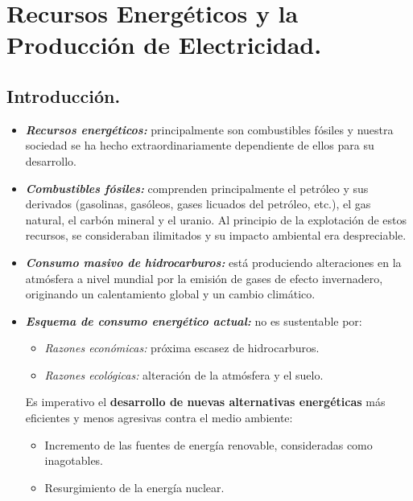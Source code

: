 \section{Recursos Energéticos y la Producción de Electricidad.}

\subsection{Introducción.}
	\begin{itemize}
		\item \textit{\textbf{Recursos energéticos:}}
			principalmente son combustibles fósiles y nuestra sociedad se ha
			hecho extraordinariamente dependiente de ellos para su desarrollo.
		
		\item \textit{\textbf{Combustibles fósiles:}}
			comprenden principalmente el petróleo y sus derivados (gasolinas,
			gasóleos, gases licuados del petróleo, etc.), el gas natural, el carbón mineral y el uranio.\linebreak
			Al principio de la explotación de estos recursos, se consideraban ilimitados y su impacto
			ambiental era despreciable.
			
		\item \textit{\textbf{Consumo masivo de hidrocarburos:}} está produciendo alteraciones en la atmósfera a nivel mundial
		por la emisión de gases de efecto invernadero, originando un calentamiento global y un cambio
		climático.
		
		\item \textit{\textbf{Esquema de consumo energético actual:}} no es sustentable por:
		\begin{itemize}
			\item \textit{Razones económicas:} próxima escasez de hidrocarburos.
			\item \textit{Razones ecológicas:} alteración de la atmósfera y el suelo.
		\end{itemize}
		Es imperativo el \textbf{desarrollo de nuevas alternativas energéticas} más eficientes y menos agresivas contra el medio ambiente:
		\begin{itemize}
			\item Incremento de las fuentes de energía renovable, consideradas como inagotables.
			\item Resurgimiento de la energía nuclear.
		\end{itemize}
	\end{itemize}
	
		
